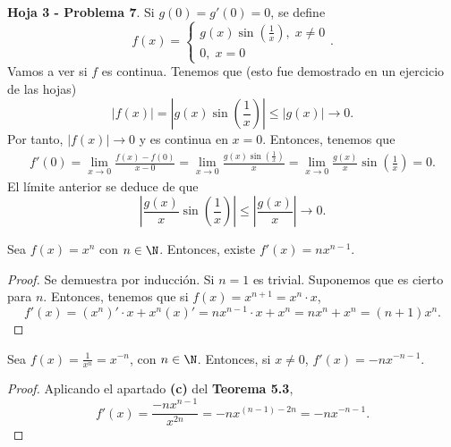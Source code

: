 \begin{eg}
\normalfont \textbf{Hoja 3 - Problema 7}. Si $\displaystyle g\left(0\right) = g'\left(0\right) = 0 $, se define
\[f\left(x\right) = 
\begin{cases}
g\left(x\right)\sin\left(\frac{1}{x}\right), \; x \neq 0\\
0, \; x = 0
\end{cases}
.\]
Vamos a ver si $\displaystyle f $ es continua. Tenemos que (esto fue demostrado en un ejercicio de las hojas)
\[ \left|f\left(x\right)\right| = \left|g\left(x\right)\sin\left(\frac{1}{x}\right)\right| \leq \left|g\left(x\right)\right| \to 0 .\]
Por tanto, $\displaystyle \left|f\left(x\right)\right| \to 0 $ y es continua en $\displaystyle x = 0 $. Entonces, tenemos que 
\[
\begin{split}
f'\left(0\right) = \lim_{x \to 0}\frac{f\left(x\right)-f\left(0\right)}{x - 0} = \lim_{x \to 0}\frac{g\left(x\right) \sin\left(\frac{1}{x}\right)}{x} = \lim_{x \to 0}\frac{g\left(x\right)}{x}\sin\left(\frac{1}{x}\right) = 0 .
\end{split}
\]
El límite anterior se deduce de que
\[ \left|\frac{g\left(x\right)}{x}\sin\left(\frac{1}{x}\right)\right| \leq \left|\frac{g\left(x\right)}{x}\right| \to 0 .\]
\end{eg}
\begin{ftheorem}[]
\normalfont Sea $\displaystyle f\left(x\right) = x^{n} $ con $\displaystyle n \in \N $. Entonces, existe $\displaystyle f'\left(x\right) = n x^{n-1} $.
\end{ftheorem}
\begin{proof}
Se demuestra por inducción. Si $\displaystyle n = 1 $ es trivial. Suponemos que es cierto para $\displaystyle n $. Entonces, tenemos que si $\displaystyle f\left(x\right) = x^{n+1} = x^{n} \cdot x $, 
\[ f'\left(x\right) = \left(x^{n}\right)' \cdot x + x^{n}\left(x\right)' = nx^{n-1} \cdot x + x^{n} = nx^{n}+x^{n} = \left(n+1\right)x^{n} .\]
\end{proof}
\begin{fcolorary}[]
\normalfont Sea $\displaystyle f\left(x\right) = \frac{1}{x^{n}} = x^{-n} $, con $\displaystyle n \in \N $. Entonces, si $\displaystyle x \neq 0 $, $\displaystyle f'\left(x\right) = -nx^{-n-1} $.
\end{fcolorary}
\begin{proof}
Aplicando el apartado \textbf{(c)} del \textbf{Teorema 5.3},
\[f'\left(x\right) = \frac{-nx^{n-1}}{x^{2n}} = -n x^{\left(n-1\right)-2n} = -nx^{-n-1} .\]
\end{proof}

